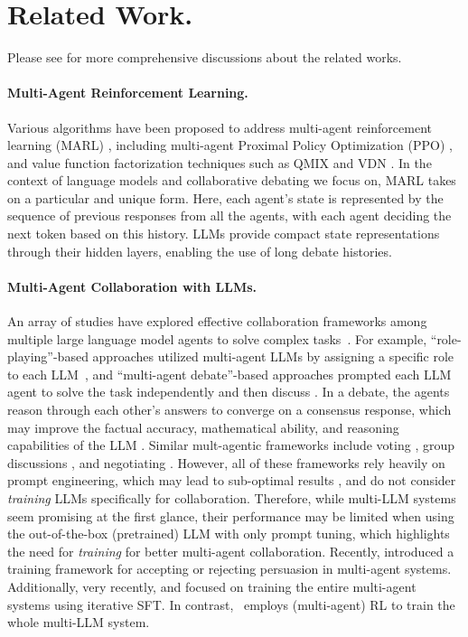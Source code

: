 \safevspace{-2.2mm}
\section{Related Work.}
Please see  for more comprehensive discussions about the related works.
\paragraph{Multi-Agent Reinforcement Learning. }
Various algorithms have been proposed to address multi-agent reinforcement learning (MARL) \cite{hernandez2019survey,zhang2021multi},  including multi-agent Proximal Policy Optimization (PPO) \citep{yu2022surprising}, and value function factorization techniques such as QMIX and VDN \citep{rashid2020monotonic, sunehag2017value}. In the context of language models and collaborative debating we focus on, MARL takes on a particular and unique form. Here, each agent's state is represented by the sequence of previous responses from all the agents, with each agent deciding the next token based on this history. LLMs provide compact state representations through their hidden layers, enabling the use of long debate histories. 

\paragraph{Multi-Agent Collaboration with LLMs. }
An array of studies have explored effective collaboration frameworks among multiple large language model agents to solve complex tasks~\citep{wu2023autogen, li2024improving, zhao2024longagent}. For example, ``role-playing''-based approaches utilized multi-agent LLMs by assigning a specific role to each LLM~\citep{li2023camel}, and ``multi-agent debate''-based approaches prompted  each LLM agent to solve the task independently and then discuss \citep{du2023improving,khandebating}. 
In a debate, the agents reason through each other's answers to converge on a consensus  response, which may improve the factual accuracy, mathematical ability, and reasoning capabilities of the LLM \citep{du2023improving,liang2023encouraging, kim2024adaptive}. Similar mult-agentic frameworks include voting \citep{wang2023selfconsistency}, group discussions \citep{chen2024reconcile}, and negotiating \citep{fu2023improving}. However, all of these frameworks rely heavily on prompt engineering, which may lead to sub-optimal results \citep{huang2023large}, and do not consider {\it training} LLMs specifically for collaboration. Therefore, while 
multi-LLM systems seem promising at the first glance, their performance may be limited when using the  out-of-the-box  (pretrained)  LLM with only prompt tuning, which highlights the need for {\it training} for better multi-agent collaboration. Recently, \citet{stengel2024teaching} introduced a training framework for accepting or rejecting persuasion in multi-agent systems. Additionally, {very recently,} 
\citet{subramaniam2025multiagent} and \citet{zhao2025sirius} focused on training the entire multi-agent systems using iterative SFT.
In contrast,  \ourstwo~employs (multi-agent) RL to train the whole multi-LLM system.



